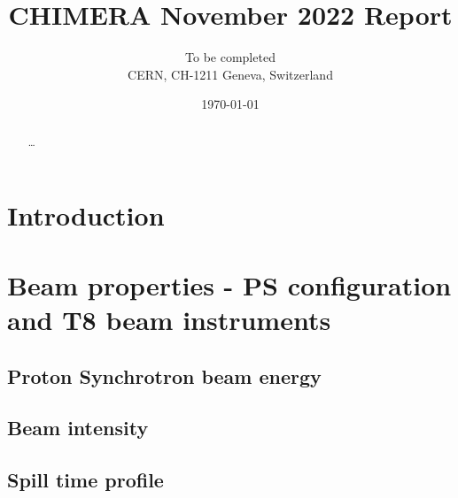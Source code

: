 \documentclass{cernatsnote}
\title{CHIMERA November 2022 Report}
\author{
    	To be completed \; \\		
    	CERN, CH-1211 Geneva, Switzerland
    }
\date{\today}
\begin{document}
    \newcommand{\figref}[1]{Fig.\,\ref{#1}}
    \newcommand{\tabref}[1]{Table\,\ref{#1}}
    \newcommand{\secref}[1]{Section\,\ref{#1}}

    \maketitle
    
    \begin{abstract}
        \ldots
    \end{abstract}

    \begingroup
    \color{black}
    \pagebreak
    \tableofcontents
    \endgroup

\pagebreak

\section{Introduction} %


\section{Beam properties - PS configuration and T8 beam instruments}

\subsection{Proton Synchrotron beam energy} %


\subsection{Beam intensity} \label{beam_intensity} %



\subsection{Spill time profile} %

\end{document}
